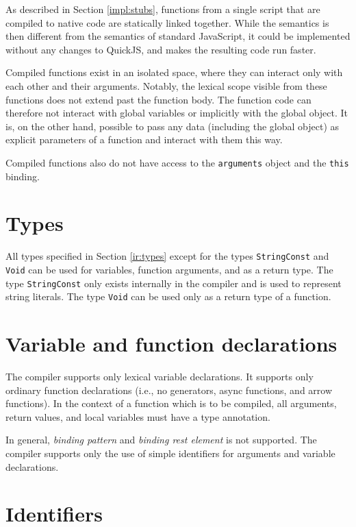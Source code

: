 As described in Section \ref{impl:stubs}, functions from a single script that are compiled to native code are statically linked together. While the semantics is then different from the semantics of standard JavaScript, it could be implemented without any changes to QuickJS, and makes the resulting code run faster.

Compiled functions exist in an isolated space, where they can interact only with each other and their arguments. Notably, the lexical scope visible from these functions does not extend past the function body. The function code can therefore not interact with global variables or implicitly with the global object. It is, on the other hand, possible to pass any data (including the global object) as explicit parameters of a function and interact with them this way.

Compiled functions also do not have access to the \texttt{arguments} object and the \texttt{this} binding.


\section{Types}

All types specified in Section \ref{ir:types} except for the types \texttt{StringConst} and \texttt{Void} can be used for variables, function arguments, and as a return type. The type \texttt{StringConst} only exists internally in the compiler and is used to represent string literals. The type \texttt{Void} can be used only as a return type of a function.


\section{Variable and function declarations}

The compiler supports only lexical variable declarations. It supports only ordinary function declarations (i.e., no generators, async functions, and arrow functions). In the context of a function which is to be compiled, all arguments, return values, and local variables must have a type annotation.

In general, \textit{binding pattern} and \textit{binding rest element} is not supported. The compiler supports only the use of simple identifiers for arguments and variable declarations.


\section{Identifiers}

